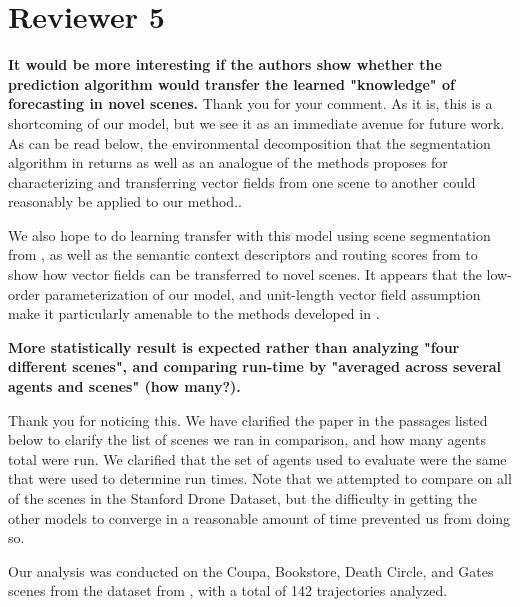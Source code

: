 \documentclass[usenames,dvipsnames]{article}
\providecommand{\response}[1]{
\noindent
\noindent\colorbox{gray!20}{
\parbox{\textwidth}{
\setlength{\parskip}{.1in}
\setlength{\parindent}{.1in}
#1}
}
}
\begin{document}
\begin{enumerate}
\begin{item}
\end{item}

\end{enumerate}

\section*{Reviewer 5}
\begin{enumerate}
\begin{item}
\textbf{
It would be more interesting if the authors show whether
the prediction algorithm would transfer the learned "knowledge" of
forecasting in novel scenes.}
Thank you for your comment. As it is, this is a shortcoming of our model, but we see it as an immediate avenue for future work. As can be read below, the environmental decomposition that the segmentation algorithm in \cite{Walker2014} returns as well as an analogue of the methods \cite{Ballan2016} proposes for characterizing and transferring vector fields from one scene to another could reasonably be applied to our method..

\response{We also hope to do learning transfer with this model using scene segmentation from \cite{Walker2014}, as well as the semantic context descriptors and routing scores from \cite{Ballan2016} to show how vector fields can be transferred to novel scenes. It appears that the low-order parameterization of our model, and unit-length vector field assumption make it particularly amenable to the methods developed in \cite{Ballan2016}.}


\end{item}
\begin{item}
\textbf{
More statistically result is expected
rather than analyzing "four different scenes", and comparing run-time
by "averaged across several agents and scenes" (how many?).}

Thank you for noticing this. We have clarified the paper in the passages listed below to clarify the list of scenes we ran in comparison, and how many agents total were run. We clarified that the set of agents used to evaluate were the same that were used to determine run times. Note that we attempted to compare on all of the scenes in the Stanford Drone Dataset, but the difficulty in getting the other models to converge in a reasonable amount of time prevented us from doing so.

\response{ Our analysis was conducted on the Coupa, Bookstore, Death Circle, and Gates scenes from the dataset from \cite{Robicquet2016}, with a total of 142 trajectories analyzed.}


\end{item}
\end{enumerate}
\end{document}
